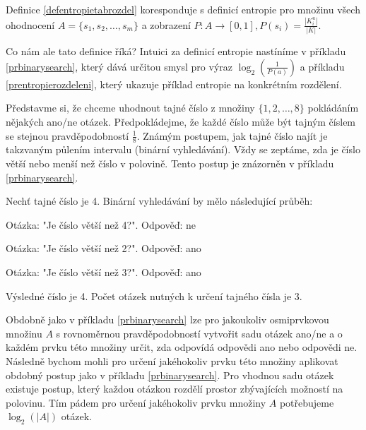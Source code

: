 \begin{pozn}
    Definice \ref{defentropietabrozdel} koresponduje s definicí entropie pro množinu všech ohodnocení $A = \{s_1, s_2, \dots, s_m \}$ a zobrazení $P\colon A \to [0,1], P(s_i) = \frac{|K^u_i|}{|K|}$.
\end{pozn}

Co nám ale tato definice říká? Intuici za definicí entropie nastíníme v příkladu \ref{prbinarysearch}, který dává určitou smysl pro výraz $\log_2\left(\frac{1}{P(a)}\right)$ a příkladu \ref{prentropierozdeleni}, který ukazuje příklad entropie na konkrétním rozdělení.

Představme si, že chceme uhodnout tajné číslo z množiny $\{1,2,\dots,8\}$ pokládáním nějakých ano/ne otázek. Předpokládejme, že každé číslo může být tajným číslem se stejnou pravděpodobností $\frac{1}{8}$. Známým postupem, jak tajné číslo najít je takzvaným půlením intervalu (binární vyhledávání). Vždy se zeptáme, zda je číslo větší nebo menší než číslo v polovině. Tento postup je znázorněn v příkladu \ref{prbinarysearch}.

\begin{prikl}\label{prbinarysearch}
Nechť tajné číslo je 4. Binární vyhledávání by mělo následující průběh:

Otázka: "Je číslo větší než 4?". 
Odpověď: ne

Otázka: "Je číslo větší než 2?". 
Odpověď: ano

Otázka: "Je číslo větší než 3?". 
Odpověď: ano

Výsledné číslo je 4. Počet otázek nutných k určení tajného čísla je 3.
\end{prikl}

\begin{pozn}\label{poznotazkynamnozinu}
Obdobně jako v příkladu \ref{prbinarysearch} lze pro jakoukoliv osmiprvkovou množinu $A$ s rovnoměrnou pravděpodobností vytvořit sadu otázek ano/ne a o každém prvku této množiny určit, zda odpovídá odpovědi ano nebo odpovědi ne. Následně bychom mohli pro určení jakéhokoliv prvku této množiny aplikovat obdobný postup jako v příkladu \ref{prbinarysearch}. Pro vhodnou sadu otázek existuje postup, který každou otázkou rozdělí prostor zbývajících možností na polovinu. Tím pádem pro určení jakéhokoliv prvku množiny $A$ potřebujeme $\log_2(|A|)$ otázek. 
\end{pozn}

